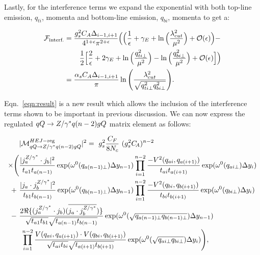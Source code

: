 		Lastly, for the interference terms we expand the exponential with both top-line emission, $q_{ti}$,
		momenta and bottom-line emission, $q_{bi}$, momenta to get a:

		\begin{align}
		\begin{split}
			\mathcal{F}_{\text{interf.}} &= \frac{g_s^2C_A\Delta_{i-1, i+1}}{4^{1+\epsilon}\pi^{2+\epsilon}}
			\Big(\Big(\frac{1}{\epsilon} + \gamma_E +  \ln\Big(\frac{\lambda_{cut}^2}{\mu^2}\Big) +
			\mathcal{O}(\epsilon)\Big) - \\
			&\hspace{0.75cm}\frac{1}{2}\Big[\frac{2}{\epsilon} + 2 \gamma_E +
			\ln\Big(\frac{q_{ti\perp}^2}{\mu^2}\Big)
			- \ln\Big(\frac{q_{bi\perp}^2}{\mu^2}\Big) +
			\mathcal{O}(\epsilon)\Big]\Big) \\
			&= \frac{\alpha_sC_A\Delta_{i-1, i+1}}{\pi}\ln\Bigg(\frac{\lambda_{cut}^2}{\sqrt{q_{ti\perp}^2
			q_{bi\perp}^2}}\Bigg).
			\label{eqn:result}
		\end{split}
		\end{align}

		Eqn.~\eqref{eqn:result} is a new result which allows the inclusion of the interference terms shown
		to be important in previous discussion.  We can now express the regulated $qQ\to Z/\gamma^* q(n-2)gQ$
		matrix element as follows:

		\begin{align}
		  \label{eq:allordereg}
		  \begin{split}
		    &|\mathcal{M}^{HEJ-{\rm reg}}_{qQ\to \zg q(n-2)gQ}|^2 =\ g_s^2 \frac{C_F}{8N_c}\ ( g_s^2
		    \Ca)^{n-2}\  \\  \times \Bigg(& \frac{| j_a^{\zg}\cdot
		      j_b|^2}{t_{a1}t_{a(n-1)}}
		    \exp(\omega^0(q_{a(n-1)\perp})\Delta y_{n-1}) \prod^{n-2}_{i=1} \frac{-V^2(q_{ai},
		      q_{a(i+1)})}{t_{ai} t_{a(i+1)}} \exp(\omega^0(q_{ai\perp})\Delta y_i)\\
		    +\ &\frac{|j_a \cdot j_b^{\zg} |^2}{t_{b1}t_{b(n-1)}} \exp(\omega^0(q_{b(n-1)\perp})\Delta y_{n-1})
		    \prod^{n-2}_{i=1}\frac{-V^2(q_{bi}, q_{b(i+1)})}{t_{bi} t_{b(i+1)}} \exp(\omega^0(q_{bi\perp})\Delta y_i) \\
		    -\ &\frac{2\Re\{ (j_a^{\zg}\cdot j_b)(\overline{j_a \cdot
		        j_b^{\zg}})\}}{\sqrt{t_{a1}t_{b1}}\sqrt{t_{a(n-1)} t_{b(n-1)}}} \exp(\omega^0(\sqrt{q_{a(n-1)\perp}q_{b(n-1)\perp}})\Delta y_{n-1})\\
		    & \; \prod^{n-2}_{i=1}\frac{V(q_{ai}, q_{a(i+1)})\cdot V(q_{bi},
		      q_{b(i+1)})}{\sqrt{t_{ai}t_{bi}} \sqrt{t_{a(i+1)}t_{b(i+1)}}}\exp(\omega^0(\sqrt{q_{ai\perp}q_{bi\perp}})\Delta y_{i})\Bigg),
		  \end{split}
		\end{align}

